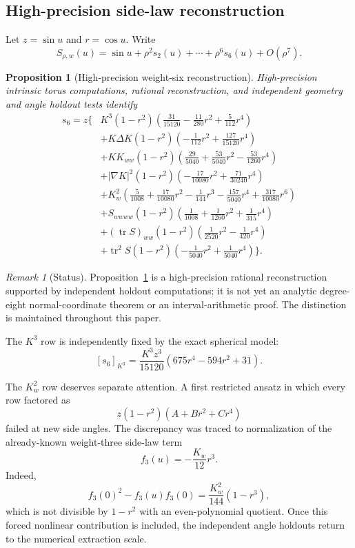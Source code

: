 \documentclass[11pt]{article}
\newtheorem{proposition}[theorem]{Proposition}
\theoremstyle{definition}
\theoremstyle{remark}
\newtheorem{remark}[theorem]{Remark}
\newcommand{\tr}{\operatorname{tr}}
\begin{document}
\subsection{High-precision side-law reconstruction}

Let \(z=\sin u\) and \(r=\cos u\).  Write
\[
S_{\rho,w}(u)
=
\sin u+\rho^2s_2(u)+\cdots+\rho^6s_6(u)+O(\rho^7).
\]

\begin{proposition}[High-precision weight-six reconstruction]
\label{prop:s6}
High-precision intrinsic torus computations, rational reconstruction, and
independent geometry and angle holdout tests identify
\[
\begin{aligned}
s_6
=
z\Bigg\{&
K^3(1-r^2)
\left(\frac{31}{15120}-\frac{11}{280}r^2+\frac5{112}r^4\right)
\\
&+K\Delta K(1-r^2)
\left(-\frac1{112}r^2+\frac{127}{15120}r^4\right)
\\
&+KK_{ww}(1-r^2)
\left(\frac{29}{5040}+\frac{53}{5040}r^2-\frac{53}{1260}r^4\right)
\\
&+|\nabla K|^2(1-r^2)
\left(-\frac{17}{10080}r^2+\frac{71}{30240}r^4\right)
\\
&+K_w^2
\left(
\frac5{1008}+\frac{17}{10080}r^2-\frac1{144}r^3
-\frac{157}{5040}r^4+\frac{317}{10080}r^6
\right)
\\
&+S_{wwww}(1-r^2)
\left(\frac1{1008}+\frac1{1260}r^2+\frac1{315}r^4\right)
\\
&+(\tr S)_{ww}(1-r^2)
\left(\frac1{2520}r^2-\frac1{420}r^4\right)
\\
&+\tr^2S(1-r^2)
\left(-\frac1{5040}r^2+\frac1{5040}r^4\right)
\Bigg\}.
\end{aligned}
\]
\end{proposition}

\begin{remark}[Status]
Proposition~\ref{prop:s6} is a high-precision rational reconstruction
supported by independent holdout computations; it is not yet an analytic
degree-eight normal-coordinate theorem or an interval-arithmetic proof.  The
distinction is maintained throughout this paper.
\end{remark}

The \(K^3\) row is independently fixed by the exact spherical model:
\[
\boxed{
[s_6]_{K^3}
=
\frac{K^3z^3}{15120}(675r^4-594r^2+31).
}
\]

The \(K_w^2\) row deserves separate attention.  A first restricted ansatz in
which every row factored as
\[
z(1-r^2)(A+Br^2+Cr^4)
\]
failed at new side angles.  The discrepancy was traced to normalization of
the already-known weight-three side-law term
\[
f_3(u)=-\frac{K_w}{12}r^3.
\]
Indeed,
\[
f_3(0)^2-f_3(u)f_3(0)
=
\frac{K_w^2}{144}(1-r^3),
\]
which is not divisible by \(1-r^2\) with an even-polynomial quotient.  Once
this forced nonlinear contribution is included, the independent angle
holdouts return to the numerical extraction scale.
\end{document}
